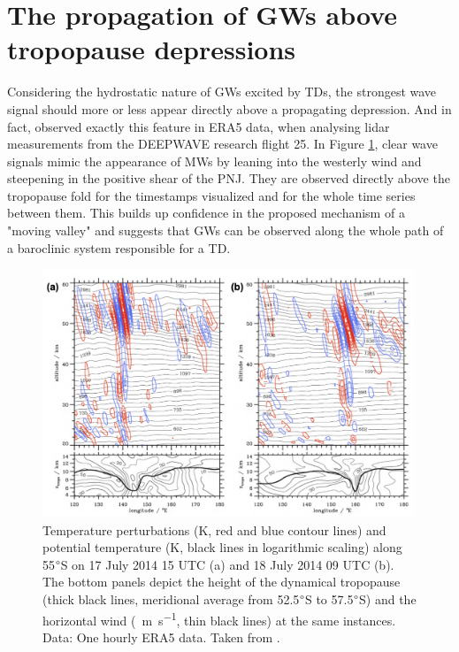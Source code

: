 \section{The propagation of GWs above tropopause depressions}
\label{sec:propagation}
Considering the hydrostatic nature of GWs excited by TDs, the strongest wave signal should more or less appear directly above a propagating depression. And in fact, \textcite{dornbrack_stratospheric_2022} observed exactly this feature in ERA5 data, when analysing lidar measurements from the DEEPWAVE research flight 25. In Figure \ref{fig:RF25_era5_vertical}, clear wave signals mimic the appearance of MWs by leaning into the westerly wind and steepening in the positive shear of the PNJ. They are observed directly above the tropopause fold for the timestamps visualized and for the whole time series between them. This builds up confidence in the proposed mechanism of a "moving valley" and suggests that GWs can be observed along the whole path of a baroclinic system responsible for a TD. \\
%
\begin{figure}[t]
    \centering
    \includegraphics[width=0.99\textwidth]{figures_intro/RF25_ERA5_vertical.png}
    \caption{Temperature perturbations (K, red and blue contour lines) and potential temperature (K, black lines in logarithmic scaling) along 55$\degree$S on 17 July 2014 15 UTC (a) and 18 July 2014 09 UTC (b). The bottom panels depict the height of the dynamical tropopause (thick black lines, meridional average from 52.5$\degree$S to 57.5$\degree$S) and the horizontal wind (\SI{}{\meter\second^{-1}}, thin black lines) at the same instances. Data: One hourly ERA5 data. Taken from \textcite[]{dornbrack_stratospheric_2022}.}
    \label{fig:RF25_era5_vertical}
\end{figure}
